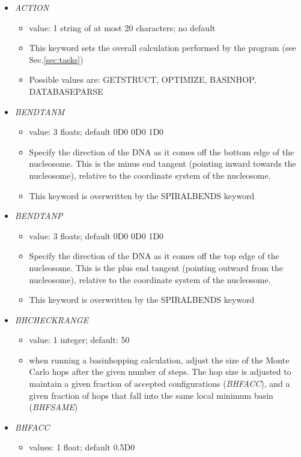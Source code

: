\documentclass[12pt,dvips]{article}
\begin{document}
\begin{itemize}
%
\item {\it ACTION}
  \begin{itemize}
    \item  value: 1 string of at most 20 characters; no default
    \item This keyword sets the overall calculation performed by the program (see Sec.\ref{sec:tasks})
    \item Possible values are: GETSTRUCT, OPTIMIZE, BASINHOP, DATABASEPARSE
  \end{itemize}
%
\item {\it BENDTANM}
  \begin{itemize}
    \item value: 3 floats; default 0D0 0D0 1D0
    \item Specify the direction of the DNA as it comes off the bottom edge of the nucleosome. This is the minus end tangent (pointing inward towards the nucleosome), relative to the coordinate system of the nucleosome.
    \item This keyword is overwritten by the SPIRALBENDS keyword
  \end{itemize}
%
\item {\it BENDTANP}
  \begin{itemize}
    \item value: 3 floats; default 0D0 0D0 1D0
    \item Specify the direction of the DNA as it comes off the top edge of the nucleosome. This is the plus end tangent (pointing outward from the nucleosome), relative to the coordinate system of the nucleosome.
    \item This keyword is overwritten by the SPIRALBENDS keyword
  \end{itemize}
%
\item {\it BHCHECKRANGE}
  \begin{itemize}
    \item value: 1 integer; default: 50
    \item when running a basinhopping calculation, adjust the size of the Monte Carlo hops after the given number of steps. The hop size is adjusted to maintain a given fraction of accepted configurations ({\em BHFACC}), and a given fraction of hops that fall into the same local minimum basin ({\em BHFSAME})
  \end{itemize}
%
\item {\it BHFACC}
  \begin{itemize}
    \item values: 1 float; default 0.5D0

\end{itemize}
\end{itemize}
\end{document}
